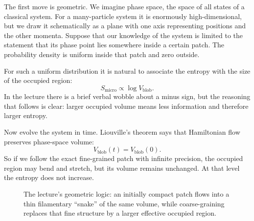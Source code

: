 The first move is geometric. We imagine phase space, the space of all states of a classical system. For a many-particle system it is enormously high-dimensional, but we draw it schematically as a plane with one axis representing positions and the other momenta. Suppose that our knowledge of the system is limited to the statement that its phase point lies somewhere inside a certain patch. The probability density is uniform inside that patch and zero outside.

For such a uniform distribution it is natural to associate the entropy with the size of the occupied region:
\begin{equation}
S_{\mathrm{micro}}\propto \log V_{\mathrm{blob}}.
\end{equation}
In the lecture there is a brief verbal wobble about a minus sign, but the reasoning that follows is clear: larger occupied volume means less information and therefore larger entropy.

Now evolve the system in time. Liouville's theorem says that Hamiltonian flow preserves phase-space volume:
\begin{equation}
V_{\mathrm{blob}}(t)=V_{\mathrm{blob}}(0).
\end{equation}
So if we follow the exact fine-grained patch with infinite precision, the occupied region may bend and stretch, but its volume remains unchanged. At that level the entropy does not increase.

\begin{figure}[h]
\centering
{}
\caption{The lecture's geometric logic: an initially compact patch flows into a thin filamentary ``snake'' of the same volume, while coarse-graining replaces that fine structure by a larger effective occupied region.}
\end{figure}

